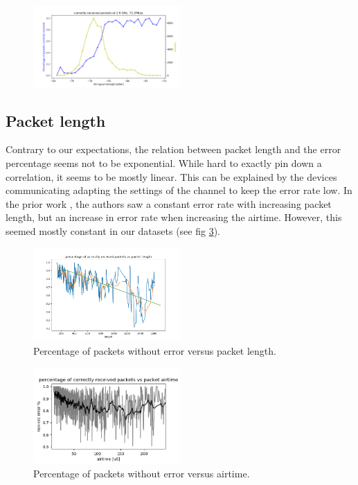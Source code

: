 \documentclass{IEEEtran}
\begin{document}
\begin{figure}
		\includegraphics[width=0.5\textwidth]{figures/24ghz72mbps.png}
		\caption{}
		\label{fig:singledatarate}
\end{figure}

\subsection{Packet length}

Contrary to our expectations, the relation between packet length and the error percentage seems not to be exponential. While hard to exactly pin down a correlation, it seems to be mostly linear. This can be explained by the devices communicating adapting the settings of the channel to keep the error rate low. In the prior work \cite{7317401}, the authors saw a constant error rate with increasing packet length, but an increase in error rate when increasing the airtime. However, this seemed mostly constant in our datasets (see fig \ref{fig:airtime}). 

\begin{figure}
		\includegraphics[width=0.5\textwidth]{figures/length.png}
		\caption{Percentage of packets without error versus packet length.}
		\label{fig:length}
\end{figure}

\begin{figure}
		\includegraphics[width=0.5\textwidth]{figures/airtime.png}
		\caption{Percentage of packets without error versus airtime.}
		\label{fig:airtime}
\end{figure}
\end{document}
